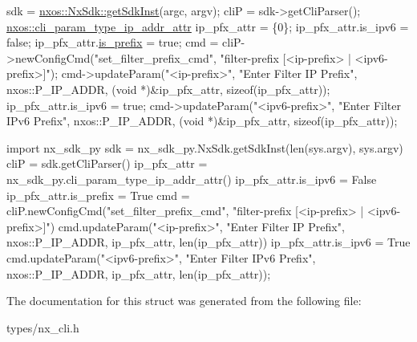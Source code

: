 \begin{DoxyCode}
sdk = \mbox{\hyperlink{classnxos_1_1_nx_sdk_a5050e2d26c40744b4fc7862068a83f39}{nxos::NxSdk::getSdkInst}}(argc, argv);
cliP = sdk->getCliParser();
\mbox{\hyperlink{structnxos_1_1cli__param__type__ip__addr__attr__}{nxos::cli\_param\_type\_ip\_addr\_attr}} ip\_pfx\_attr = \{0\};
ip\_pfx\_attr.is\_ipv6 = \textcolor{keyword}{false};
ip\_pfx\_attr.\mbox{\hyperlink{structnxos_1_1cli__param__type__ip__addr__attr___a0a059b592a9bc394c9fed521fb5a9552}{is\_prefix}} = \textcolor{keyword}{true};
cmd = cliP->newConfigCmd(\textcolor{stringliteral}{"set\_filter\_prefix\_cmd"},
                         \textcolor{stringliteral}{"filter-prefix [<ip-prefix> | <ipv6-prefix>]"});
cmd->updateParam(\textcolor{stringliteral}{"<ip-prefix>"}, \textcolor{stringliteral}{"Enter Filter IP Prefix"}, nxos::P\_IP\_ADDR,
                 (\textcolor{keywordtype}{void} *)&ip\_pfx\_attr, \textcolor{keyword}{sizeof}(ip\_pfx\_attr));
ip\_pfx\_attr.is\_ipv6 = \textcolor{keyword}{true};
cmd->updateParam(\textcolor{stringliteral}{"<ipv6-prefix>"}, \textcolor{stringliteral}{"Enter Filter IPv6 Prefix"}, nxos::P\_IP\_ADDR,
                 (\textcolor{keywordtype}{void} *)&ip\_pfx\_attr, \textcolor{keyword}{sizeof}(ip\_pfx\_attr));
\end{DoxyCode}



\begin{DoxyCode}
\textcolor{keyword}{import} nx\_sdk\_py
sdk = nx\_sdk\_py.NxSdk.getSdkInst(len(sys.argv), sys.argv)
cliP = sdk.getCliParser()
ip\_pfx\_attr = nx\_sdk\_py.cli\_param\_type\_ip\_addr\_attr()
ip\_pfx\_attr.is\_ipv6 = \textcolor{keyword}{False}
ip\_pfx\_attr.is\_prefix = \textcolor{keyword}{True}
cmd = cliP.newConfigCmd(\textcolor{stringliteral}{"set\_filter\_prefix\_cmd"},
                        \textcolor{stringliteral}{"filter-prefix [<ip-prefix> | <ipv6-prefix>]"})
cmd.updateParam(\textcolor{stringliteral}{"<ip-prefix>"}, \textcolor{stringliteral}{"Enter Filter IP Prefix"}, nxos::P\_IP\_ADDR,
                ip\_pfx\_attr, len(ip\_pfx\_attr))
ip\_pfx\_attr.is\_ipv6 = \textcolor{keyword}{True}
cmd.updateParam(\textcolor{stringliteral}{"<ipv6-prefix>"}, \textcolor{stringliteral}{"Enter Filter IPv6 Prefix"}, nxos::P\_IP\_ADDR,
                ip\_pfx\_attr, len(ip\_pfx\_attr));
\end{DoxyCode}
 

The documentation for this struct was generated from the following file\+:\begin{DoxyCompactItemize}
\item 
types/nx\+\_\+cli.\+h\end{DoxyCompactItemize}
